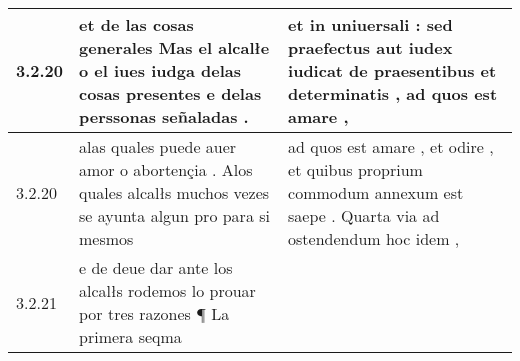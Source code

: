 \begin{tabular}{|p{1cm}|p{6.5cm}|p{6.5cm}|}
3.2.20 & et de las cosas generales Mas el alcalłe o el iues iudga delas cosas presentes e delas perssonas señaladas . & et in uniuersali : sed praefectus aut iudex iudicat de praesentibus et determinatis , ad quos est amare , \\\hline
3.2.20 & alas quales puede auer amor o abortençia . Alos quales alcalłs muchos vezes se ayunta algun pro para si mesmos & ad quos est amare , et odire , et quibus proprium commodum annexum est saepe . Quarta via ad ostendendum hoc idem , \\\hline
3.2.21 & e de deue dar ante los alcalłs rodemos lo prouar por tres razones ¶ La primera seqma &  \\\hline

\end{tabular}
